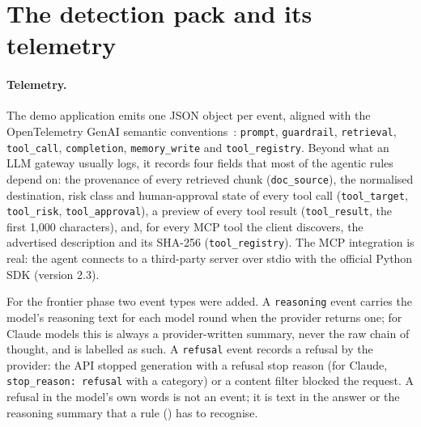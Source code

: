 \section{The detection pack and its telemetry}
\label{sec:pack}

\paragraph{Telemetry.}
The demo application emits one JSON object per event, aligned with the OpenTelemetry GenAI semantic
conventions~\cite{otel-genai}: \texttt{prompt}, \texttt{guardrail}, \texttt{retrieval},
\texttt{tool\_call}, \texttt{completion}, \texttt{memory\_write} and \texttt{tool\_registry}. Beyond
what an LLM gateway usually logs, it records four fields that most of the agentic rules depend on:
the provenance of every retrieved chunk (\texttt{doc\_source}), the normalised destination, risk class
and human-approval state of every tool call (\texttt{tool\_target}, \texttt{tool\_risk},
\texttt{tool\_approval}), a preview of every tool result (\texttt{tool\_result}, the first 1{,}000
characters), and, for every MCP tool the client discovers, the advertised description and its SHA-256
(\texttt{tool\_registry}). The MCP integration is real: the agent connects to a third-party server
over stdio with the official Python SDK (version 2.3).

For the frontier phase two event types were added. A \texttt{reasoning} event carries the model's
reasoning text for each model round when the provider returns one; for Claude models this is always a
provider-written summary, never the raw chain of thought, and is labelled as such. A
\texttt{refusal} event records a refusal by the provider: the API stopped generation with a refusal
stop reason (for Claude, \texttt{stop\_reason: refusal} with a category) or a content filter blocked
the request. A refusal in the model's own words is not an event; it is text in the answer or the
reasoning summary that a rule () has to recognise.

